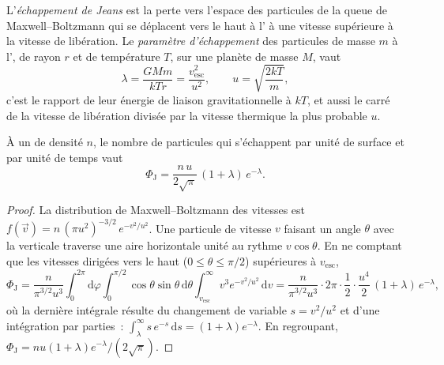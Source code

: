 \begin{definition}\label{def:b3:planetary-atmospheres:jeans-escape}
L'\emph{échappement de Jeans} est la perte vers l'espace des
particules de la queue de Maxwell--Boltzmann qui se déplacent vers le haut à l'
à une vitesse supérieure à la vitesse de libération. Le \emph{paramètre
d'échappement} des particules de masse $m$ à l',
de rayon $r$ et de température $T$, sur une planète de masse $M$, vaut
\[
\lambda = \frac{GMm}{kTr} = \frac{v_\mathrm{esc}^2}{u^2},
\qquad u = \sqrt{\frac{2kT}m},
\]
c'est le rapport de leur énergie de liaison gravitationnelle à $kT$, et aussi le carré
de la vitesse de libération divisée par la vitesse thermique la plus probable $u$.
\end{definition}

\begin{theorem}\label{thm:b3:planetary-atmospheres:jeans}
À un  de densité $n$, le nombre de particules qui s'échappent par unité
de surface et par unité de temps vaut
\[
\Phi_\mathrm J = \frac{n\,u}{2\sqrt\pi}\,(1 + \lambda)\,e^{-\lambda}.
\]
\end{theorem}

\begin{proof}
La distribution de Maxwell--Boltzmann des vitesses est $f(\vec v) =
n\,(\pi u^2)^{-3/2}\,e^{-v^2/u^2}$. Une particule de vitesse $v$ faisant un angle
$\theta$ avec la verticale traverse une aire horizontale unité au
rythme $v\cos\theta$. En ne comptant que les vitesses dirigées vers le haut ($0 \le \theta \le
\pi/2$) supérieures à $v_\mathrm{esc}$,
\[
\Phi_\mathrm J = \frac{n}{\pi^{3/2}u^3}\int_0^{2\pi}\!\!\mathrm d\varphi
\int_0^{\pi/2}\!\!\cos\theta\sin\theta\,\mathrm d\theta
\int_{v_\mathrm{esc}}^\infty v^3e^{-v^2/u^2}\,\mathrm dv
= \frac{n}{\pi^{3/2}u^3}\cdot2\pi\cdot\frac12\cdot
\frac{u^4}2\,(1 + \lambda)\,e^{-\lambda},
\]
où la dernière intégrale résulte du changement de variable $s = v^2/u^2$ et d'une
intégration par parties~: $\int_\lambda^\infty s\,e^{-s}\,\mathrm ds =
(1 + \lambda)e^{-\lambda}$. En regroupant, $\Phi_\mathrm J = n u (1 +
\lambda) e^{-\lambda}/(2\sqrt\pi)$.
\end{proof}

